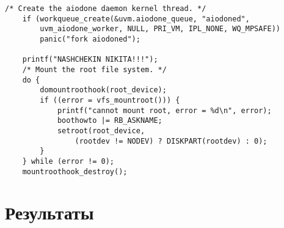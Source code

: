 \documentclass[a4paper, 14pt]{extarticle}
\begin{document}
\begin{verbatim}
/* Create the aiodone daemon kernel thread. */
	if (workqueue_create(&uvm.aiodone_queue, "aiodoned",
	    uvm_aiodone_worker, NULL, PRI_VM, IPL_NONE, WQ_MPSAFE))
		panic("fork aiodoned");

	printf("NASHCHEKIN NIKITA!!!");
	/* Mount the root file system. */
	do {
		domountroothook(root_device);
		if ((error = vfs_mountroot())) {
			printf("cannot mount root, error = %d\n", error);
			boothowto |= RB_ASKNAME;
			setroot(root_device,
			    (rootdev != NODEV) ? DISKPART(rootdev) : 0);
		}
	} while (error != 0);
	mountroothook_destroy();
\end{verbatim}
\pagebreak

\section{Результаты}
\end{document}
